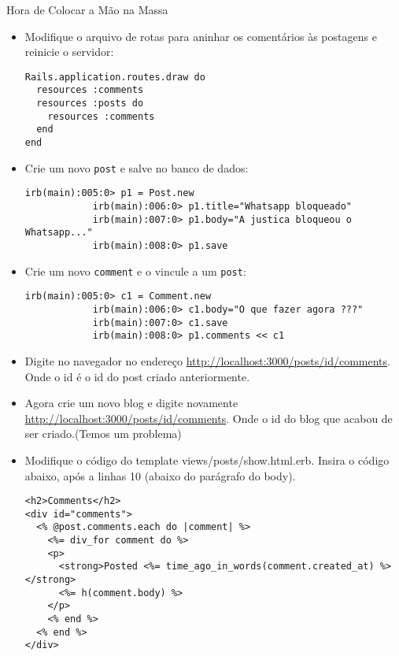 \begin{frame}{Hora de Colocar a Mão na Massa}
	\begin{itemize}
		\item Modifique o arquivo de rotas para aninhar os comentários às postagens e reinicie o servidor:
		\begin{lstlisting}[style=RubyInputStyle, caption=config/routes.rb]
Rails.application.routes.draw do
  resources :comments
  resources :posts do 
    resources :comments
  end 
end 
		\end{lstlisting}

		\item Crie um novo \verb|post| e salve no banco de dados:
		\begin{lstlisting}[style=BashInputBasicStyle]
			irb(main):005:0> p1 = Post.new
			irb(main):006:0> p1.title="Whatsapp bloqueado"
			irb(main):007:0> p1.body="A justica bloqueou o Whatsapp..."
			irb(main):008:0> p1.save
		\end{lstlisting}
		
		\item Crie um novo \verb|comment| e o vincule a um \verb|post|:
		\begin{lstlisting}[style=BashInputBasicStyle]
			irb(main):005:0> c1 = Comment.new
			irb(main):006:0> c1.body="O que fazer agora ???"
			irb(main):007:0> c1.save
			irb(main):008:0> p1.comments << c1
		\end{lstlisting}
		
		\item Digite no navegador no endereço \url{http://localhost:3000/posts/id/comments}. Onde 
		o \alert{id} é o id do post criado anteriormente.
				
		\item Agora crie um novo blog e digite novamente \url{http://localhost:3000/posts/id/comments}. Onde 
		o \alert{id} do blog que acabou de ser criado.(\alert{Temos um problema})
				
		\item Modifique o código do template \alert{views/posts/show.html.erb}. Insira o código abaixo, após 
		a linhas 10 (abaixo do parágrafo do body).
		\begin{lstlisting}[style=RubyInputStyle]
<h2>Comments</h2>
<div id="comments">
  <% @post.comments.each do |comment| %>
    <%= div_for comment do %>
    <p>
      <strong>Posted <%= time_ago_in_words(comment.created_at) %></strong>
      <%= h(comment.body) %>
    </p>
    <% end %>
  <% end %>
</div>
		\end{lstlisting}


\end{itemize}
\end{frame}
